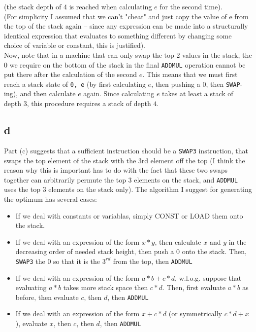
(the stack depth of $4$ is reached when calculating $e$ for the second time).\\
(For simplicity I assumed that we can't "cheat" and just copy the value of e from the top of the stack again -- since any expression can be made into a structurally identical expression that evaluates to something different by changing some choice of variable or constant, this is justified).\\

Now, note that in a machine that can only swap the top $2$ values in the stack, the $0$ we require on the bottom of the stack in the final \texttt{ADDMUL} operation cannot be put there after the calculation of the second $e$. This means that we must first reach a stack state of \texttt{0, e} (by first calculating $e$, then pushing a $0$, then \texttt{SWAP}-ing), and then calculate $e$ again. Since calculating $e$ takes at least a stack of depth $3$, this procedure requires a stack of depth $4$.

\subsection{d}

Part (c) suggests that a sufficient instruction should be a \texttt{SWAP3} instruction, that swaps the top element of the stack with the 3rd element off the top (I think the reason why this is important has to do with the fact that these two swaps together can arbitrarily permute the top $3$ elements on the stack, and \texttt{ADDMUL} uses the top $3$ elements on the stack only).
The algorithm I suggest for generating the optimum has several cases:
\begin{itemize}
\item If we deal with constants or variablas, simply CONST or LOAD them onto the stack.
\item If we deal with an expression of the form $x * y$, then calculate $x$ and $y$ in the decreasing order of needed stack height, then push a $0$ onto the stack. Then, \texttt{SWAP3} the $0$ so that it is the $3^{rd}$ from the top, then \texttt{ADDMUL}
\item If we deal with an expression of the form $a*b + c*d$, w.l.o.g. suppose that evaluating $a*b$ takes more stack space then $c*d$. Then, first evaluate $a*b$ as before, then evaluate $c$, then $d$, then \texttt{ADDMUL}
\item If we deal with an expression of the form $x + c * d$ (or symmetrically $c * d + x$), evaluate $x$, then $c$, then $d$, then \texttt{ADDMUL}
\end{itemize}
